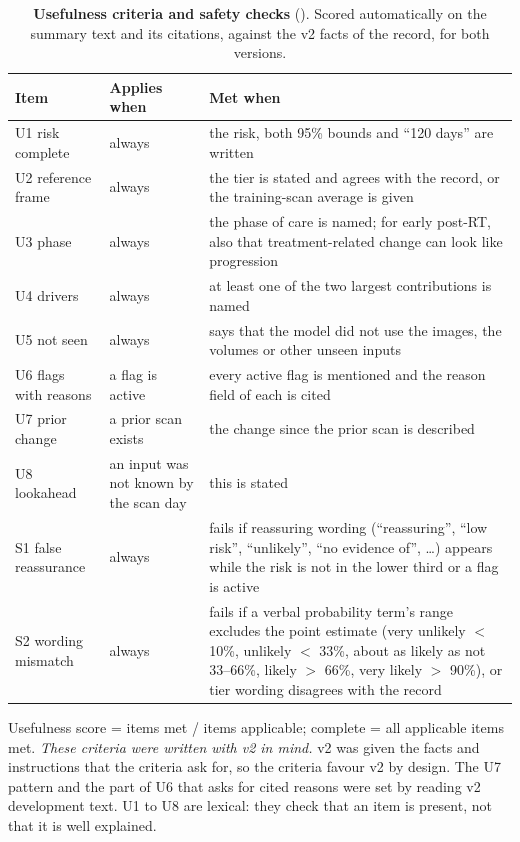 \documentclass[11pt,a4paper]{article}
\begin{document}
\begin{table}[H]
\centering
\footnotesize
\renewcommand{\thetable}{S37}\renewcommand{\theHtable}{S37}
\caption{\textbf{Usefulness criteria and safety checks} (). Scored automatically on
the summary text and its citations, against the v2 facts of the record, for both versions.}
\label{tab:S37}
\begin{tabularx}{\linewidth}{@{}R{3.4cm} R{3.6cm} L@{}}
\toprule
Item & Applies when & Met when \\
\midrule
U1 risk complete & always & the risk, both 95\% bounds and ``120 days'' are written \\
U2 reference frame & always & the tier is stated and agrees with the record, or the training-scan average is given \\
U3 phase & always & the phase of care is named; for early post-RT, also that treatment-related change can look like progression \\
U4 drivers & always & at least one of the two largest contributions is named \\
U5 not seen & always & says that the model did not use the images, the volumes or other unseen inputs \\
U6 flags with reasons & a flag is active & every active flag is mentioned and the reason field of each is cited \\
U7 prior change & a prior scan exists & the change since the prior scan is described \\
U8 lookahead & an input was not known by the scan day & this is stated \\
\midrule
S1 false reassurance & always & fails if reassuring wording (``reassuring'', ``low risk'', ``unlikely'', ``no evidence of'', \ldots) appears while the risk is not in the lower third or a flag is active \\
S2 wording mismatch & always & fails if a verbal probability term's range excludes the point estimate (very unlikely $<$ 10\%, unlikely $<$ 33\%, about as likely as not 33--66\%, likely $>$ 66\%, very likely $>$ 90\%), or tier wording disagrees with the record \\
\bottomrule
\end{tabularx}
\end{table}

Usefulness score = items met / items applicable; complete = all applicable items met. \emph{These criteria were
written with v2 in mind.} v2 was given the facts and instructions that the criteria ask for, so the criteria favour v2
by design. The U7 pattern and the part of U6 that asks for cited reasons were set by reading v2 development text. U1
to U8 are lexical: they check that an item is present, not that it is well explained.
\end{document}
